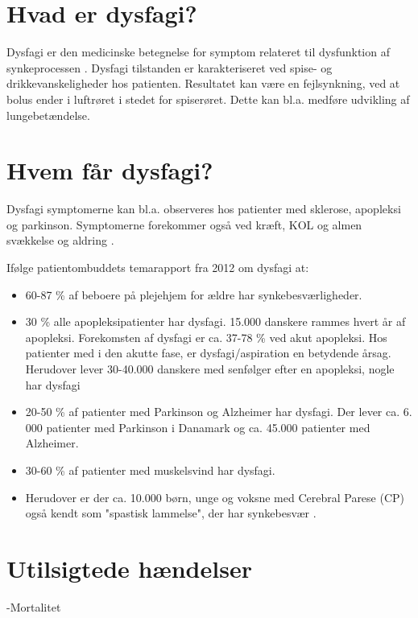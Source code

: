 \documentclass[main.tex]{subfiles}
\begin{document}
\section*{Hvad er dysfagi?}
Dysfagi er den medicinske betegnelse for symptom relateret til dysfunktion af synkeprocessen \cite{KjaersgaardPh.d.studerendeDYSFAGIKonsekvenser}. Dysfagi tilstanden er karakteriseret ved spise- og drikkevanskeligheder hos patienten. Resultatet kan være en fejlsynkning, ved at bolus ender i luftrøret i stedet for spiserøret. Dette kan bl.a. medføre udvikling af lungebetændelse.
\section*{Hvem får dysfagi?}

 Dysfagi symptomerne kan bl.a. observeres hos patienter med sklerose, apopleksi og parkinson.   Symptomerne forekommer også ved kræft, KOL og almen svækkelse og aldring \cite{SallyRefsgaardTinesterbyKristensen2015DysfagiKommune}. 

Ifølge patientombuddets temarapport fra 2012 om dysfagi at:

\begin{itemize}
\item 60-87 \% af beboere på plejehjem for ældre har synkebesværligheder.
\item 30 \% alle apopleksipatienter har dysfagi. 15.000 danskere rammes hvert år af apopleksi. Forekomsten af dysfagi er ca. 37-78 \% ved akut apopleksi. Hos patienter med i den akutte fase, er dysfagi/aspiration en betydende årsag. Herudover lever 30-40.000 danskere med senfølger efter en apopleksi, nogle har dysfagi
\item 20-50 \% af patienter med Parkinson og Alzheimer har dysfagi. Der lever ca. 6. 000 patienter med Parkinson i Danamark og ca. 45.000 patienter med Alzheimer.  
\item 30-60 \% af patienter med muskelsvind har dysfagi.
\item Herudover er der ca. 10.000 børn, unge og voksne med Cerebral Parese (CP) også kendt som "spastisk lammelse", der har synkebesvær \cite{Bommersholdt2012TemarapportDysfagi}. 
\end{itemize}

\section*{Utilsigtede hændelser}
-Mortalitet
\end{document}
